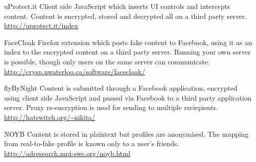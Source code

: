     \begin{desc}
    
        \item[uProtect.it] Client side JavaScript which inserts UI controls and intercepts content. Content is encrypted, stored and decrypted all on a third party server. \hfill \\
        \url{http://uprotect.it/index}
        
        \item[FaceCloak] Firefox extension which posts fake content to Facebook, using it as an index to the encrypted content on a third party server. Running your own server is possible, though only users on the same server can communicate. \hfill \\
        \url{http://crysp.uwaterloo.ca/software/facecloak/}
        
        \item[flyByNight] Content is submitted through a Facebook application, encrypted using client side JavaScript and passed via Facebook to a third party application server. Proxy re-encryption is used for sending to multiple reciepients. \hfill \\
        \url{http://hatswitch.org/~nikita/}
        
        \item[NOYB] Content is stored in plaintext but profiles are anonymised. The mapping from real-to-fake profile is known only to a user's friends. \hfill \\
        \url{http://adresearch.mpi-sws.org/noyb.html}
        
    \end{desc}





